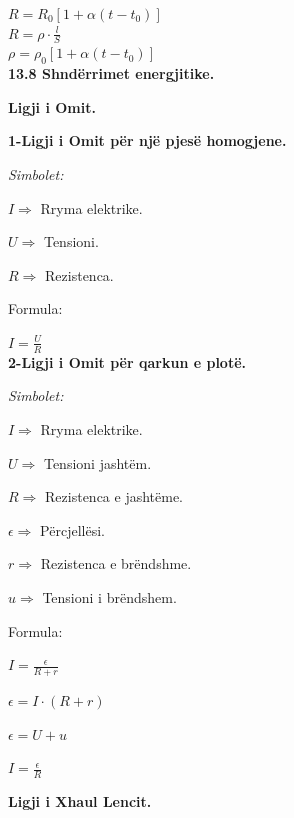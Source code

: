 \documentclass[twocolumn]{article}
\begin{document}
	$R=R_0[1+\alpha(t-t_0)]$\\
	
	$R= \rho \cdot \frac{l}{S}$\\
	
	$\rho=\rho_0 [1+\alpha(t-t_0)]$\\
	
	
	\textbf{13.8 Shndërrimet energjitike.}
	
	\begin{center}
		\textbf{	Ligji i Omit.}
	\end{center}
	
	\textbf{1-Ligji i Omit për një pjesë homogjene.}
	
	\begin{center}
		\textit{Simbolet:}
	\end{center}
	
	$I \Rightarrow $ Rryma elektrike.
	
	$U \Rightarrow $ Tensioni.
	
	$R \Rightarrow $ Rezistenca.
	
	\begin{center}
		Formula:
	\end{center}
	
	$I=\frac{U}{R}$\\
	
	\textbf{2-Ligji i Omit për qarkun e plotë.}
	
	\begin{center}
		\textit{Simbolet:}
	\end{center}
	
	$I \Rightarrow $ Rryma elektrike.
	
	$U \Rightarrow $ Tensioni jashtëm.
	
	$R \Rightarrow $ Rezistenca e jashtëme.
	
	$\epsilon \Rightarrow$ Përcjellësi.
	
	$r \Rightarrow $ Rezistenca e brëndshme.
	
	$u \Rightarrow $ Tensioni i brëndshem.
	
	
	
	\begin{center}
		Formula:
	\end{center}
	
	$I=\frac{\epsilon}{R+r}$ 
	
	$\epsilon=I \cdot (R+r)$
	
	$\epsilon=U+u$
	
	$I=\frac{\epsilon}{R}$
	
	\begin{center}
		\textbf{	Ligji i Xhaul Lencit.}
	\end{center}
	
\end{document}
